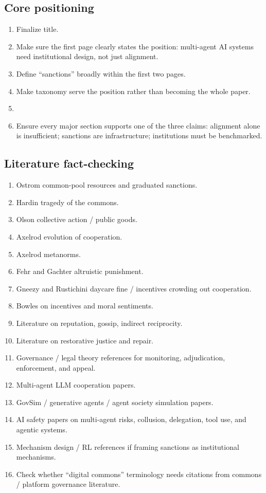 \subsection*{Core positioning}
\begin{enumerate}
  \item[$\square$] Finalize title.
  \item[$\square$] Make sure the first page clearly states the position: multi-agent AI systems need institutional design, not just alignment.
  \item[$\square$] Define ``sanctions'' broadly within the first two pages.
  \item[$\square$] Make taxonomy serve the position rather than becoming the whole paper.
  \item[$\square$] 
  \item[$\square$] Ensure every major section supports one of the three claims: alignment alone is insufficient; sanctions are infrastructure; institutions must be benchmarked.
\end{enumerate}

\subsection*{Literature fact-checking}
\begin{enumerate}
  \item[$\square$] Ostrom common-pool resources and graduated sanctions.
  \item[$\square$] Hardin tragedy of the commons.
  \item[$\square$] Olson collective action / public goods.
  \item[$\square$] Axelrod evolution of cooperation.
  \item[$\square$] Axelrod metanorms.
  \item[$\square$] Fehr and Gachter altruistic punishment.
  \item[$\square$] Gneezy and Rustichini daycare fine / incentives crowding out cooperation.
  \item[$\square$] Bowles on incentives and moral sentiments.
  \item[$\square$] Literature on reputation, gossip, indirect reciprocity.
  \item[$\square$] Literature on restorative justice and repair.
  \item[$\square$] Governance / legal theory references for monitoring, adjudication, enforcement, and appeal.
  \item[$\square$] Multi-agent LLM cooperation papers.
  \item[$\square$] GovSim / generative agents / agent society simulation papers.
  \item[$\square$] AI safety papers on multi-agent risks, collusion, delegation, tool use, and agentic systems.
  \item[$\square$] Mechanism design / RL references if framing sanctions as institutional mechanisms.
  \item[$\square$] Check whether ``digital commons'' terminology needs citations from commons / platform governance literature.
\end{enumerate}

